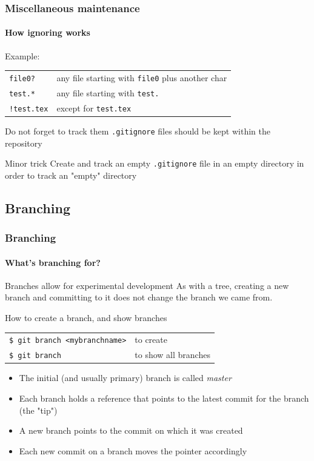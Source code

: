 \begin{frame}
\frametitle{Miscellaneous maintenance}
\framesubtitle{How ignoring works}

\begin{block}{Example:}
\begin{tabular}{ll}
\texttt{file0?} & any file starting with \texttt{file0} plus another char \\
\texttt{test.*} & any file starting with \texttt{test.}\\
\texttt{!test.tex} & except for \texttt{test.tex} \\
\end{tabular}
\end{block}

\pause
\begin{block}{Do not forget to track them}
\texttt{.gitignore} files should be kept within the repository
\end{block}
\pause
\begin{block}{Minor trick}
Create and track an empty \texttt{.gitignore} file in an empty directory in order to track an "empty" directory
\end{block}
\end{frame}

\subsection{Branching}

\begin{frame}
\frametitle{Branching}
\framesubtitle{What's branching for?}

\begin{block}{Branches allow for experimental development}
As with a tree, creating a new branch and committing to it does not change the branch we came from.
\end{block}

\begin{block}{How to create a branch, and show branches}
\begin{tabular}{ll}
\texttt{\$ git branch <mybranchname>} & to create \\
\texttt{\$ git branch} & to show all branches
\end{tabular}

\medskip
\begin{itemize}
\item The initial (and usually primary) branch is called {\em master}
\item Each branch holds a reference that points to the latest commit for the branch (the "tip")
\item A new branch points to the commit on which it was created
\item Each new commit on a branch moves the pointer accordingly
\end{itemize}
\end{block}

\end{frame}

